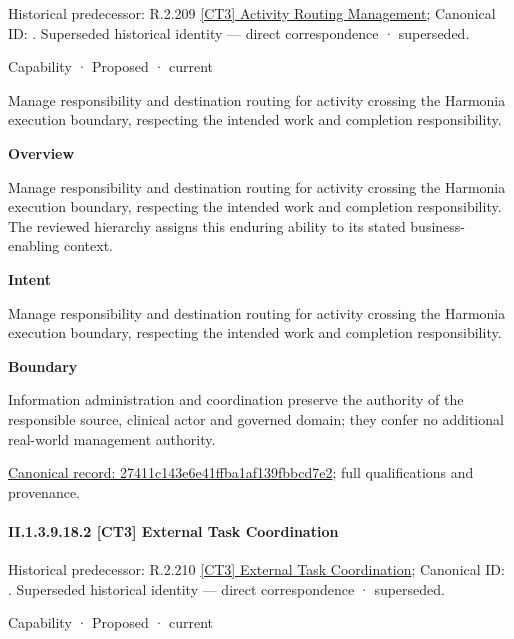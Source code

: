 {\small Historical predecessor: R.2.209 \hyperref[element:243ea93e7b7448fe97dc74f90bfc8946]{[CT3] Activity Routing Management}; Canonical ID: \texttt{}. Superseded historical identity — direct correspondence · superseded.}\par
\label{element:27411c143e6e41ffba1af139fbbcd7e2}
{\small Capability · Proposed · current}\par

Manage responsibility and destination routing for activity crossing the Harmonia execution boundary, respecting the intended work and completion responsibility.



\textbf{Overview}



Manage responsibility and destination routing for activity crossing the Harmonia execution boundary, respecting the intended work and completion responsibility. The reviewed hierarchy assigns this enduring ability to its stated business-enabling context.



\textbf{Intent}



Manage responsibility and destination routing for activity crossing the Harmonia execution boundary, respecting the intended work and completion responsibility.



\textbf{Boundary}



Information administration and coordination preserve the authority of the responsible source, clinical actor and governed domain; they confer no additional real-world management authority.


{\footnotesize \href{../../../../continuum/strategy/capability/27411c143e6e41ffba1af139fbbcd7e2.md}{Canonical record: 27411c143e6e41ffba1af139fbbcd7e2}; full qualifications and provenance.}\par
\paragraph*{II.1.3.9.18.2 [CT3] External Task Coordination}
\label{navigation:II.1.3.9.18.2}

{\small Historical predecessor: R.2.210 \hyperref[element:32be309d65594592bac4d7b068def0d2]{[CT3] External Task Coordination}; Canonical ID: \texttt{}. Superseded historical identity — direct correspondence · superseded.}\par
\label{element:ff3447c929724245a13ee864874b5561}
{\small Capability · Proposed · current}\par

